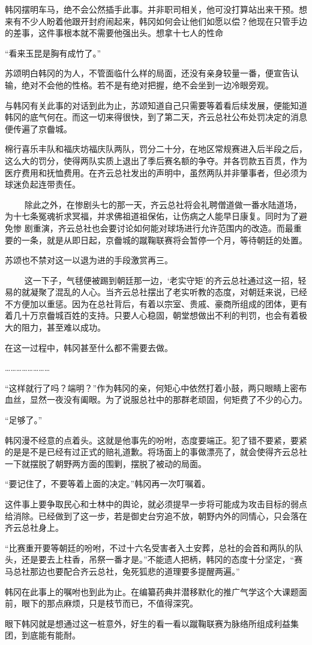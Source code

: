 韩冈摆明车马，绝不会公然插手此事。并非职司相关，他可没打算站出来干预。想来有不少人盼着他跟开封府闹起来，韩冈如何会让他们如愿以偿？他现在只管手边的差事，这件事根本就不需要他强出头。想拿十七人的性命

“看来玉昆是胸有成竹了。”

苏颂明白韩冈的为人，不管面临什么样的局面，还没有亲身较量一番，便宣告认输，绝对不会他的性格。若不是有绝对把握，绝不会坐到一边冷眼旁观。

与韩冈有关此事的对话到此为止，苏颂知道自己只需要等着看后续发展，便能知道韩冈的底气何在。而这一切来得很快，到了第二天，齐云总社公布处罚决定的消息便传遍了京齤城。

棉行喜乐丰队和福庆坊福庆队两队，罚分二十分，在地区常规赛进入后半段之后，这么大的罚分，使得两队实质上退出了季后赛名额的争夺。并各罚款五百贯，作为医疗费用和抚恤费用。在齐云总社发出的声明中，虽然两队并非肇事者，但必须为球迷负起连带责任。

　 　除此之外，在惨剧头七的那一天，齐云总社将会礼聘僧道做一番水陆道场，为十七条冤魂祈求冥福，并求佛祖道祖保佑，让伤病之人能早日康复。同时为了避免惨 剧重演，齐云总社也会要讨论如何能对球场进行允许范围内的改造。而最重要的一条，就是从即日起，京齤城的蹴鞠联赛将会暂停一个月，等待朝廷的处置。

苏颂也不禁对这一以退为进的手段激赏再三。

　 　这一下子，气毬便被踢到朝廷那一边，‘老实守矩’的齐云总社通过这一招，轻易的就凝聚了混乱的人心。当齐云总社摆出了老实听教的态度，对朝廷来说，已经 不方便加以重惩。因为在总社背后，有着以宗室、贵戚、豪商所组成的团体，更有着几十万京齤城百姓的支持。只要人心稳固，朝堂想做出不利的判罚，也会有着极 大的阻力，甚至难以成功。

在这一过程中，韩冈甚至什么都不需要去做。

……………………

“这样就行了吗？端明？”作为韩冈的亲，何矩心中依然打着小鼓，两只眼睛上密布血丝，显然一夜没有阖眼。为了说服总社中的那群老顽固，何矩费了不少的心力。

“足够了。”

韩冈漫不经意的点着头。这就是他事先的吩咐，态度要端正。犯了错不要紧，要紧的是是不是已经有过正式的赔礼道歉。将场面上的事做漂亮了，就会使得齐云总社一下就摆脱了朝野两方面的围剿，摆脱了被动的局面。

“要记住了，不要等着上面的决定。”韩冈再一次叮嘱着。

这件事上要争取民心和士林中的舆论，就必须提早一步将可能成为攻击目标的弱点给消除。已经做到了这一步，若是御史台穷追不放，朝野内外的同情心，只会落在齐云总社身上。

“比赛重开要等朝廷的吩咐，不过十六名受害者入土安葬，总社的会首和两队的队头，还是要去上柱香，吊祭一番才是。”不能遗人把柄，韩冈的态度十分坚定，“赛马总社那边也要配合齐云总社，兔死狐悲的道理要多提醒两遍。”

韩冈在此事上的嘱咐也到此为止。在编纂药典并潜移默化的推广气学这个大课题面前，眼下的那点麻烦，只是枝节而已，不值得深究。

眼下韩冈就是想通过这一桩意外，好生的看一看以蹴鞠联赛为脉络所组成利益集团，到底能有能耐。

